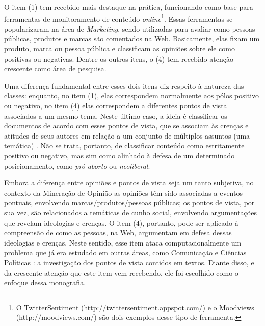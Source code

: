 O item (1) tem recebido mais destaque na prática, funcionando como base para ferramentas de monitoramento de conteúdo \emph{online}\footnote{O TwitterSentiment (http://twittersentiment.appspot.com/) e o Moodviews (http://moodviews.com/) são dois exemplos desse tipo de ferramenta.}. Essas ferramentas se popularizaram na área de \emph{Marketing}, sendo utilizadas para avaliar como pessoas públicas, produtos e marcas são comentados na Web. Basicamente, elas fixam um produto, marca ou pessoa pública e classificam as opiniões sobre ele como positivas ou negativas. Dentre os outros itens, o (4) tem recebido  atenção crescente como área de pesquisa. %

Uma diferença fundamental entre esses dois itens diz respeito à natureza das classes: enquanto, no item (1), elas correspondem normalmente aos pólos positivo ou negativo, no item (4) elas correspondem a diferentes pontos de vista associados a um mesmo tema. Neste último caso, a ideia é classificar os documentos de acordo com esses pontos de vista, que se associam às crenças e atitudes de seus autores em relação a um conjunto de múltiplos assuntos (uma temática) \cite{omsa}. Não se trata, portanto, de classificar conteúdo como estritamente positivo ou negativo, mas sim como alinhado à defesa de um determinado posicionamento, como \emph{pró-aborto} ou \emph{neoliberal}. 

Embora a diferença entre opiniões e pontos de vista seja um tanto subjetiva, no contexto da Mineração de Opinião as opiniões têm sido associadas a eventos pontuais, envolvendo marcas/produtos/pessoas públicas; os pontos de vista, por sua vez, são relacionados a temáticas de cunho social, envolvendo argumentações que revelam ideologias e crenças. O item (4), portanto, pode ser aplicado à compreensão de como as pessoas, na Web, argumentam em defesa dessas ideologias e crenças. Neste sentido, esse item ataca computacionalmente um problema que já era estudado em outras áreas, como Comunicação e Ciências Políticas \cite{gentzkow, milyo, fader}: a investigação dos pontos de vista contidos em textos. Diante disso, e da crescente atenção que este item vem recebendo, ele foi escolhido como o enfoque dessa monografia. 

